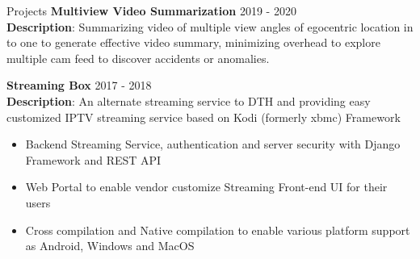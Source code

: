 \documentclass{resume} %
\begin{document}
\begin{rSection}{Projects}
\textbf{Multiview Video Summarization} \hfill {2019 - 2020}\\
\textbf{Description}: Summarizing video of multiple view angles of egocentric location in to one to generate effective video summary, minimizing overhead to explore multiple cam feed to discover accidents or anomalies.



\textbf{Streaming Box} \hfill {2017 - 2018}\\
\textbf{Description}: An alternate streaming service to DTH and providing easy customized IPTV streaming service based on Kodi (formerly xbmc) Framework

\begin{itemize}
    \item Backend Streaming Service, authentication and server security with Django Framework and REST API
    \item Web Portal to enable vendor customize Streaming Front-end UI for their users
    \item Cross compilation and Native compilation to enable various platform support as Android, Windows and MacOS
\end{itemize}

\end{rSection}



\end{document}
